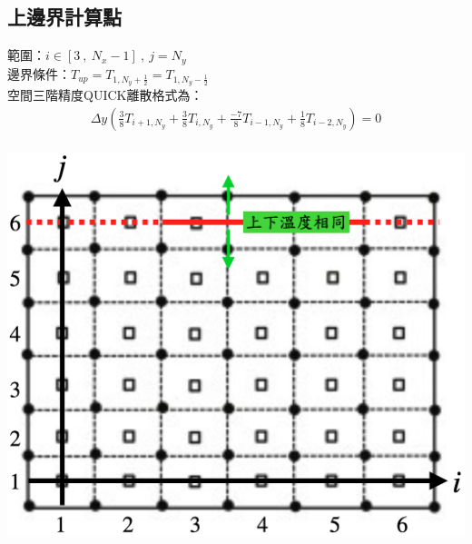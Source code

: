 \documentclass[12pt]{article}
\begin{document}
\subsection{上邊界計算點}
 \begin{minipage}{0.6\textwidth}
    \noindent 範圍：$i\in[3\ ,\ N_{x}-1]\ ,\ j=N_{y}$\\[1.5ex]
   \noindent 邊界條件：$T_{up} = T_{1,N_{y}+\frac{1}{2}}=T_{1,N_{y}-\frac{1}{2}}$\\[1.5ex]
   \noindent 空間三階精度QUICK離散格式為：
   \begin{equation*}\label{eq:QUICK4}\begin{split}
    \Delta y (\frac{3}{8}T_{i+1,N_{y}} + \frac{3}{8}T_{i,N_{y}} +  \frac{-7}{8}T_{i-1,N_{y}}+ \frac{1}{8}T_{i-2,N_{y}}) = 0 \\[1.5ex]
   \end{split}\end{equation*}
   \end{minipage}%
   \hfill
   \begin{minipage}{0.34\textwidth}
   \centering
   \includegraphics[width=\linewidth,height=9\baselineskip]{17.png}
   \label{fig:4boundary}
\end{minipage}
\end{document}
